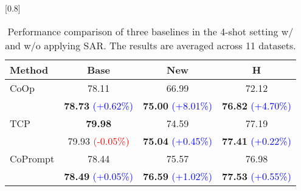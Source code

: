 \begin{table}[!t]
    \small \centering
    \renewcommand{\arraystretch}{0.9}
    \setlength{\tabcolsep}{8pt}
    \scalebox{0.8}[0.8]{
    \begin{tabular}{l cc | c }
    \toprule
    Method  & Base & New & H \\
    \midrule
    CoOp & 78.11 & 66.99 & 72.12 \\
    \cellcolor{gray!20}{\textbf{+SAR}} 
    & \cellcolor{gray!20}\textbf{78.73} \textcolor{blue}{(+0.62\%)} 
    & \cellcolor{gray!20}\textbf{75.00} \textcolor{blue}{(+8.01\%)} 
    & \cellcolor{gray!20}\textbf{76.82} \textcolor{blue}{(+4.70\%)} \\
    \midrule
    TCP & \textbf{79.98} & 74.59 & 77.19 \\
    \cellcolor{gray!20}{\textbf{+SAR}} 
    & \cellcolor{gray!20}79.93 \textcolor{red}{(-0.05\%)} 
    & \cellcolor{gray!20}\textbf{75.04} \textcolor{blue}{(+0.45\%)} 
    & \cellcolor{gray!20}\textbf{77.41} \textcolor{blue}{(+0.22\%)} \\
    \midrule
    CoPrompt & 78.44 & 75.57 & 76.98 \\
    \cellcolor{gray!20}{\textbf{+SAR}} 
    & \cellcolor{gray!20}\textbf{78.49} \textcolor{blue}{(+0.05\%)} 
    & \cellcolor{gray!20}\textbf{76.59} \textcolor{blue}{(+1.02\%)} 
    & \cellcolor{gray!20}\textbf{77.53} \textcolor{blue}{(+0.55\%)} \\
    \bottomrule
    \end{tabular}
    }
    \vspace{+0.0em}
    \caption{Performance comparison of three baselines in the 4-shot setting w/ and w/o applying SAR. The results are averaged across 11 datasets.}
    \label{tab:4shot_b2n}
    \vspace{+0.0em}
\end{table}


